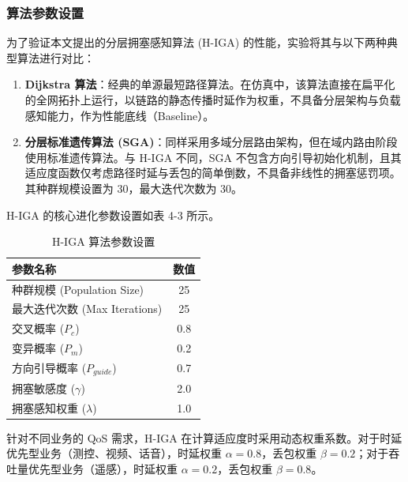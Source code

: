     \subsubsection{算法参数设置}
    为了验证本文提出的分层拥塞感知算法 (H-IGA) 的性能，实验将其与以下两种典型算法进行对比：
    \begin{enumerate}
        \item \textbf{Dijkstra 算法}：经典的单源最短路径算法。在仿真中，该算法直接在扁平化的全网拓扑上运行，以链路的静态传播时延作为权重，不具备分层架构与负载感知能力，作为性能底线（Baseline）。
        \item \textbf{分层标准遗传算法 (SGA)}：同样采用多域分层路由架构，但在域内路由阶段使用标准遗传算法。与 H-IGA 不同，SGA 不包含方向引导初始化机制，且其适应度函数仅考虑路径时延与丢包的简单倒数，不具备非线性的拥塞惩罚项。其种群规模设置为 30，最大迭代次数为 30。
    \end{enumerate}
    
    H-IGA 的核心进化参数设置如表 4-3 所示。
    
    \begin{table}[htbp]
      \caption{H-IGA 算法参数设置}
      \centering
      \begin{tabular}{lc}
        \toprule
        \textbf{参数名称} & \textbf{数值} \\
        \midrule
        种群规模 (Population Size) & 25 \\
        最大迭代次数 (Max Iterations) & 25 \\
        交叉概率 ($P_c$) & 0.8 \\
        变异概率 ($P_m$) & 0.2 \\
        方向引导概率 ($P_{guide}$) & 0.7 \\
        拥塞敏感度 ($\gamma$) & 2.0 \\
        拥塞感知权重 ($\lambda$) & 1.0 \\
        \bottomrule
      \end{tabular}
      \label{tab:iga_params}
    \end{table}
    
    针对不同业务的 QoS 需求，H-IGA 在计算适应度时采用动态权重系数。对于时延优先型业务（测控、视频、话音），时延权重 $\alpha=0.8$，丢包权重 $\beta=0.2$；对于吞吐量优先型业务（遥感），时延权重 $\alpha=0.2$，丢包权重 $\beta=0.8$。

    

    